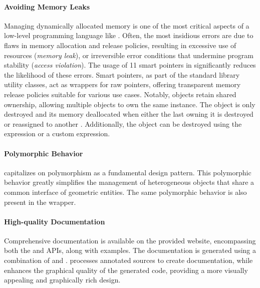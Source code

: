 \paragraph{Avoiding Memory Leaks}
Managing dynamically allocated memory is one of the most critical aspects of a low-level programming language like \cpp{}. Often, the most insidious errors are due to flaws in memory allocation and release policies, resulting in excessive use of resources (\emph{memory leak}), or irreversible error conditions that undermine program stability (\emph{access violation}). The usage of \cpp{}11 smart pointers in \Acme{} significantly reduces the likelihood of these errors. Smart pointers, as part of the standard library utility classes, act as wrappers for raw pointers, offering transparent memory release policies suitable for various use cases. Notably, \SharedPointer{} objects retain shared ownership, allowing multiple objects to own the same instance. The object is only destroyed and its memory deallocated when either the last \SharedPointer{} owning it is destroyed or reassigned to another \SharedPointer{}. Additionally, the object can be destroyed using the  expression or a custom  expression.

\paragraph{Polymorphic Behavior}
\Acme{} capitalizes on \cpp{} polymorphism as a fundamental design pattern. This polymorphic behavior greatly simplifies the management of heterogeneous objects that share a common interface of geometric entities. The same \cpp{} polymorphic behavior is also present in the \Matlab{} \Mex{} wrapper.

\paragraph{High-quality Documentation}
Comprehensive documentation is available on the provided website, encompassing both the \cpp{} and \Matlab{} \Mex{} \acp{API}, along with examples. The documentation is generated using a combination of \Doxygen{} and \Sphinx{}. \Doxygen{} processes annotated \cpp{} sources to create documentation, while \Sphinx{} enhances the graphical quality of the generated \html{} code, providing a more visually appealing and graphically rich design.

